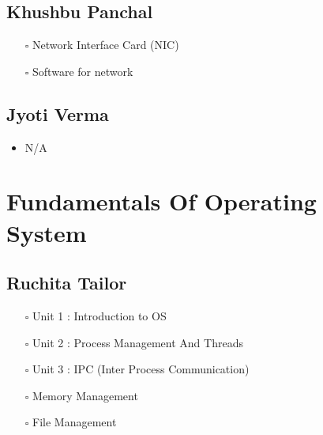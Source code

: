 \documentclass[11pt]{article}
\begin{document}
\subsection{Khushbu Panchal}
\label{sec:orgcc61aa2}
\begin{itemize}
\item[{$\square$}] Network Interface Card (NIC)
\item[{$\square$}] Software for network
\end{itemize}

\subsection{Jyoti Verma}
\label{sec:org69d64ed}
\begin{itemize}
\item N/A
\end{itemize}

\section{Fundamentals Of Operating System}
\label{sec:org4468140}
\subsection{Ruchita Tailor}
\label{sec:org4571e70}
\begin{itemize}
\item[{$\square$}] Unit 1 : Introduction to OS
\item[{$\square$}] Unit 2 : Process Management And Threads
\item[{$\square$}] Unit 3 : IPC (Inter Process Communication)
\item[{$\square$}] Memory Management
\item[{$\square$}] File Management
\end{itemize}
\end{document}
